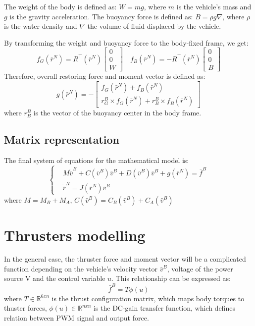     The weight of the body is defined as: $W=m g$, where $m$ is the vehicle's mass and $g$ is the gravity acceleration. 
    The buoyancy force is defined as: $B=\rho g \nabla$, where $\rho$ is the water density and $\nabla$ the volume of fluid displaced by the vehicle. 
    
    By transforming the weight and buoyancy force to the body-fixed frame, we get:
    $$
    f_G\left(\bar{r}^N\right)=R^{\top}\left(\bar{r}^N\right)\left[\begin{array}{l}
    0 \\
    0 \\
    W
    \end{array}\right] \quad f_B\left(\bar{r}^N\right)=-R^{\top}\left(\bar{r}^N\right)\left[\begin{array}{l}
    0 \\
    0 \\
    B
    \end{array}\right]
    $$
    Therefore, overall restoring force and moment vector is defined as:
    $$
    g(\bar{r}^N)=-\left[\begin{array}{c}
    f_G(\bar{r}^N)+f_B(\bar{r}^N) \\
    r_G^B \times f_G(\bar{r}^N)+r_B^B \times f_B(\bar{r}^N)
    \end{array}\right]
    $$
    where $r_B^B$ is the vector of the buoyancy center in the body frame. 

\subsection{Matrix representation}

    The final system of equations for the mathematical model is:
    $$
    \begin{cases}
    & M \dot{\bar{v}}^B + C(\bar{v}^B) \bar{v}^B+D(\bar{v}^B) \bar{v}^B+g(\bar{r}^N)= \bar{f}^B\\
    & \dot{\bar{r}}^N=J(\bar{r}^N) \bar{v}^B
    \end{cases}
    $$
    where
    $M=M_B+M_A$, $C(\bar{v}^B)=C_B(\bar{v}^B)+C_A(\bar{v}^B)$

\section{Thrusters modelling}


    In the general case, the thruster force and moment vector will be 
    a complicated function depending on the vehicle's velocity vector $\bar{v}^B$, 
    voltage of the power source V 
    and the control variable $u$.
    This relationship can be expressed as:
    $$
    \bar{f}^B=T\phi(u)
    $$
    where $T \in \mathbb{R}^{6 x n}$ is the thrust configuration matrix, which maps body torques to thuster forces, 
    $\phi(u) \in \mathbb{R}^{n x n}$ is the DC-gain transfer function, which defines relation between
    PWM signal and output force.


